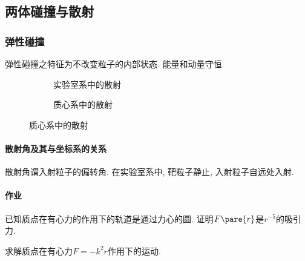 \documentclass[../LectureNotes.tex]{subfiles}
\begin{document}



\subsection{两体碰撞与散射} %
\label{sub:两体碰撞与散射}

\subsubsection{弹性碰撞} %
\label{ssub:弹性碰撞}

弹性碰撞之特征为不改变粒子的内部状态. 能量和动量守恒.

\begin{figure}[ht]
    \centering
    \begin{subfigure}{5cm}
        \centering
        \caption{实验室系中的散射}
    \end{subfigure}
    \begin{subfigure}{5cm}
        \centering
        \caption{质心系中的散射}
    \end{subfigure}
\end{figure}

\paragraph{散射角及其与坐标系的关系} %
\label{par:散射角及其与坐标系的关系}

散射角谓入射粒子的偏转角. 在实验室系中, 靶粒子静止, 入射粒子自远处入射.


\paragraph{作业} %
\label{par:作业}

已知质点在有心力的作用下的轨道是通过力心的圆. 证明$F\pare{r}$是$r^{-5}$的吸引力.
\par
求解质点在有心力$F = -k^2r$作用下的运动.

\end{document}
